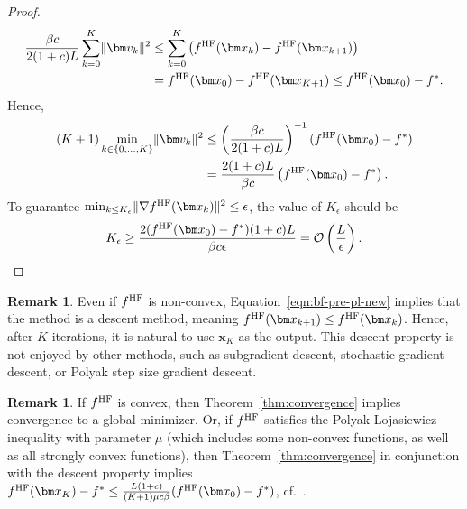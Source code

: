 \documentclass[10pt]{article} %
\numberwithin{equation}{section}
\theoremstyle{plain}
\theoremstyle{definition}
\newtheorem{remark}[theorem]{Remark}
\newcommand{\<}{\langle}
\renewcommand{\>}{\rangle}
\renewcommand{\(}{\left(}
\renewcommand{\)}{\right)}
\renewcommand{\[}{\left[}
\renewcommand{\]}{\right]}
\newcommand{\HF}{\textup{HF}}
\newcommand{\Lip}{L}
\begin{document}
\begin{proof}
    \begin{equation}
    \begin{aligned}
        \frac{\beta c}{2(1+c)\Lip} \sum_{k=0}^K\lVert \bm v_k\rVert^2
        &\leq \sum_{k=0}^K \left(f^\HF(\bm x_k) - f^\HF(\bm x_{k+1})\right)\\
        &= f^\HF(\bm x_0) - f^\HF(\bm x_{K+1})\leq f^\HF(\bm x_0) - f^*.
    \end{aligned}
    \end{equation}
    Hence, 
    \begin{equation}
    \begin{aligned}
        (K+1)\min_{k\in\{0,\dots,K\}}\lVert \bm v_k\rVert^2 &\leq \left(\frac{\beta c}{2(1+c)\Lip}\right)^{-1}(f^\HF(\bm x_0) - f^*)\\
        &= \frac{2(1+c)\Lip}{\beta c}\left(f^\HF(\bm x_0) - f^*\right).
    \end{aligned}
    \end{equation}
    To guarantee $\min_{k\le K_\epsilon}\lVert\nabla f^\HF(\bm x_k)\rVert^2\le \epsilon$, the value of $K_\epsilon$ should be 
    \begin{equation}
    \label{eq:K-bd}
    K_\epsilon \ge 
        \frac{2(f^\HF(\bm x_0) - f^*)(1+c)\Lip}{\beta c\epsilon} = \mathcal{O}\left(\frac{\Lip}{\epsilon}\right).
    \end{equation}
\end{proof}

\begin{remark}
    Even if $f^\HF$ is non-convex, Equation~\eqref{eqn:bf-pre-pl-new} implies that the method is a descent method, meaning $f^\HF(\bm x_{k+1} ) \le f^\HF(\bm x_{k} )$. Hence, after $K$ iterations, it is natural to use $\bm x_K$ as the output. This descent property is not enjoyed by other methods, such as subgradient descent, stochastic gradient descent, or Polyak step size gradient descent.
\end{remark}
\begin{remark}
If $f^\HF$ is convex, then Theorem~\ref{thm:convergence} implies convergence to a global minimizer. Or, if $f^\HF$ satisfies the Polyak-Lojasiewicz inequality with parameter $\mu$ (which includes some non-convex functions, as well as all strongly convex functions), then Theorem~\ref{thm:convergence} in conjunction with the descent property implies
$f^\HF(\bm x_K) - f^\ast \le \frac{\Lip(1+c)}{(K + 1)\mu c\beta}(f^\HF(\bm x_0) - f^\ast)$, cf.~\citet{karimi2016linear_PL}.
\end{remark}
\end{document}
